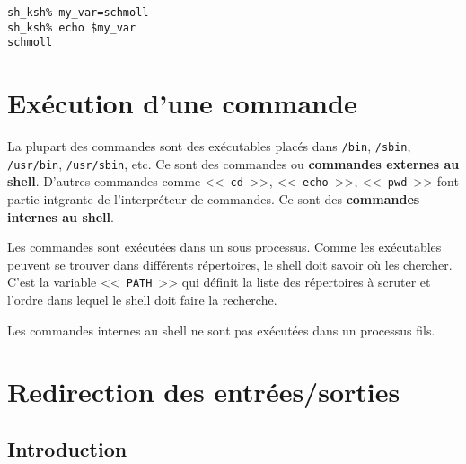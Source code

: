 \begin{example}
\begin{verbatim}
sh_ksh% my_var=schmoll
sh_ksh% echo $my_var
schmoll
\end{verbatim}
\end{example}

\section{\label{basicnot-exec}Ex{\'e}cution d'une commande}

La plupart des commandes sont des ex{\'e}cutables plac{\'e}s dans
\texttt{/bin}, \texttt{/sbin}, \texttt{/usr/bin}, \texttt{/usr/sbin},
etc. Ce sont des commandes {\Unix} ou
\textbf{commandes externes au shell}. D'autres
commandes comme <<~\texttt{cd}~>>, <<~\texttt{echo}~>>,
<<~\texttt{pwd}~>> font partie intgrante de l'interpr{\'e}teur de commandes.
Ce sont des \textbf{commandes internes au shell}.

Les commandes {\Unix} sont ex{\'e}cut{\'e}es dans un sous processus.
Comme les ex{\'e}cutables peuvent se trouver dans diff{\'e}rents
r{\'e}pertoires, le shell doit savoir o{\`u} les chercher. C'est la
variable <<~\texttt{PATH}~>> qui
d{\'e}finit la liste des r{\'e}pertoires {\`a} scruter et l'ordre dans
lequel le shell doit faire la recherche.

\begin{remarque}
Les commandes internes au shell ne sont pas ex{\'e}cut{\'e}es dans un processus fils.
\end{remarque}

\section{\label{redirect-io}Redirection des entr{\'e}es/sorties}

\subsection{Introduction}

